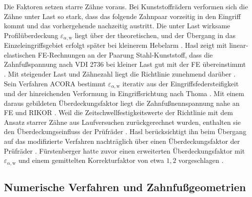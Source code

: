 Die Faktoren setzen starre Zähne voraus. Bei Kunststoffrädern verformen sich die Zähne unter Last so stark, dass das folgende Zahnpaar vorzeitig in den Eingriff kommt und das vorhergehende nachzeitig austritt. Die unter Last wirksame Profilüberdeckung $\varepsilon_{\alpha,\mathrm{w}}$ liegt über der theoretischen, und der Übergang in das Einzeleingriffsgebiet erfolgt später bei kleinerem Hebelarm \cite[S.~31]{Has18}. Hasl zeigt mit linear-elastischen FE-Rechnungen an der Paarung Stahl-Kunststoff, dass die Zahnfußspannung nach VDI 2736 bei kleiner Last gut mit der FE übereinstimmt \cite[S.~29 bis 31]{Has18}. Mit steigender Last und Zähnezahl liegt die Richtlinie zunehmend darüber \cite[S.~31 bis 32]{Has18}. Sein Verfahren ACORA bestimmt $\varepsilon_{\alpha,\mathrm{w}}$ iterativ aus der Eingriffsfedersteifigkeit und der hinreichenden Verformung in Eingriffsrichtung nach Thoma \cite[S.~35 bis 39]{Has18}. Mit einem daraus gebildeten Überdeckungsfaktor liegt die Zahnfußnennspannung nahe an FE und RIKOR \cite[S.~43 bis 44]{Has18}. Weil die Zeitschwellfestigkeitswerte der Richtlinie mit dem Ansatz starrer Zähne aus Laufversuchen zurückgerechnet wurden, enthalten sie den Überdeckungseinfluss der Prüfräder \cite[S.~47]{Has18}. Hasl berücksichtigt ihn beim Übergang auf das modifizierte Verfahren nachträglich über einen Überdeckungsfaktor der Prüfräder \cite[S.~48]{Has18}. Fürstenberger hatte zuvor einen erweiterten Überdeckungsfaktor mit $\varepsilon_{\alpha,\mathrm{w}}$ und einem gemittelten Korrekturfaktor von etwa $1{,}2$ vorgeschlagen \cite[S.~132 bis 133]{Fuer13}.

\subsection{Numerische Verfahren und Zahnfußgeometrien}
\label{sec:numerik_fussgeometrien}

